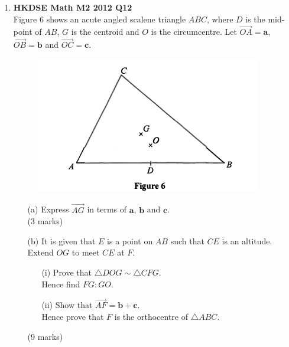 \documentclass{report}
\begin{document}
\begin{enumerate}
	\newpage

	\item \textbf{HKDSE Math M2 2012 Q12}\\
	Figure 6 shows an acute angled scalene triangle $ABC$, where $D$ is the mid-point of $AB$, $G$ is the centroid and $O$ is the circumcentre. Let $\overrightarrow{OA} = \textbf{a}$, $\overrightarrow{OB} = \textbf{b}$ and $\overrightarrow{OC} = \textbf{c}$.
	\begin{figure}[H]
		\centering
		\includegraphics[width = .5\linewidth]{2012Figure6}
	\end{figure}
	\begin{enumerate}
		\item [(a)]Express $\overrightarrow{AG}$ in terms of $\textbf{a}$, $\textbf{b}$ and $\textbf{c}$.\\(3 marks)
		\item [(b)]It is given that $E$ is a point on $AB$ such that $CE$ is an altitude. Extend $OG$ to meet $CE$ at $F$. 
		\begin{enumerate}
			\item [(i)]Prove that $\triangle DOG \sim \triangle CFG$. \\
			Hence find $FG:GO$. 
			\item [(ii)]Show that $\overrightarrow{AF} = \textbf{b} + \textbf{c}$. \\
			Hence prove that $F$ is the orthocentre of $\triangle ABC$.
		\end{enumerate}
		(9 marks)
	\end{enumerate}


\end{enumerate}
\end{document}
